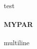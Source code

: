 \documentclass{book}
\newcommand{\donothing}[1]{#1}
\newcommand{\mypar}{\paragraph{MYPAR}}
\begin{document}
\donothing{test}
\mypar
\blindtext

\donothing{

multiline

}
\end{document}
